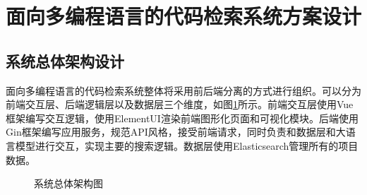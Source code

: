 \documentclass[UTF8,a4paper,12pt]{ctexart}
\numberwithin{equation}{section}
\begin{document}
\section{面向多编程语言的代码检索系统方案设计}
\subsection{系统总体架构设计}
面向多编程语言的代码检索系统整体将采用前后端分离的方式进行组织。可以分为前端交互层、后端逻辑层以及数据层三个维度，如图\ref{all_structure}所示。前端交互层使用Vue框架编写交互逻辑，使用ElementUI渲染前端图形化页面和可视化模块。后端使用Gin框架编写应用服务，规范API风格，接受前端请求，同时负责和数据层和大语言模型进行交互，实现主要的搜索逻辑。数据层使用Elasticsearch管理所有的项目数据。
\begin{figure}[H]
	\caption{系统总体架构图}
	\label{all_structure}
\end{figure}
\end{document}
